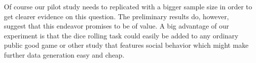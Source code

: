 \documentclass[12pt, a4paper]{article}
\begin{document}
 Of course our pilot study needs to replicated with a bigger sample size in order to get clearer evidence on this question. The preliminary results do, however, suggest that this endeavor promises to be of value. A big advantage of our experiment is that the dice rolling task could easily be added to any ordinary public good game or other study that features social behavior which might make further data generation easy and cheap.




\end{document}
